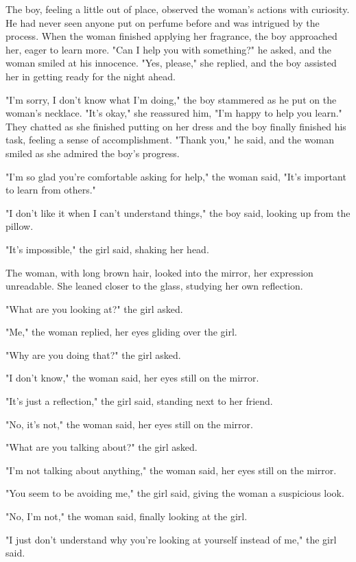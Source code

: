 \documentclass[smalldemyvopaper,11pt,twoside,onecolumn,openright,extrafontsizes]{memoir}
\begin{document}
The boy, feeling a little out of place, observed the woman's actions with curiosity. He had never seen anyone put on perfume before and was intrigued by the process. When the woman finished applying her fragrance, the boy approached her, eager to learn more. "Can I help you with something?" he asked, and the woman smiled at his innocence. "Yes, please," she replied, and the boy assisted her in getting ready for the night ahead.\par
"I'm sorry, I don't know what I'm doing," the boy stammered as he put on the woman's necklace. "It's okay," she reassured him, "I'm happy to help you learn." They chatted as she finished putting on her dress and the boy finally finished his task, feeling a sense of accomplishment. "Thank you," he said, and the woman smiled as she admired the boy's progress.\par
"I'm so glad you're comfortable asking for help," the woman said, "It's important to learn from others."\par
"I don't like it when I can't understand things," the boy said, looking up from the pillow.\par
"It's impossible," the girl said, shaking her head.\par
The woman, with long brown hair, looked into the mirror, her expression unreadable. She leaned closer to the glass, studying her own reflection.\par
"What are you looking at?" the girl asked.\par
"Me," the woman replied, her eyes gliding over the girl.\par
"Why are you doing that?" the girl asked.\par
"I don't know," the woman said, her eyes still on the mirror.\par
"It's just a reflection," the girl said, standing next to her friend.\par
"No, it's not," the woman said, her eyes still on the mirror.\par
"What are you talking about?" the girl asked.\par
"I'm not talking about anything," the woman said, her eyes still on the mirror.\par
"You seem to be avoiding me," the girl said, giving the woman a suspicious look.\par
"No, I'm not," the woman said, finally looking at the girl.\par
"I just don't understand why you're looking at yourself instead of me," the girl said.\par
\end{document}
